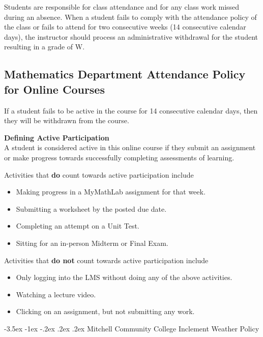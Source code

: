 \documentclass[11pt]{article}
\makeatletter
\renewcommand\section{\@startsection{section}{1}{0pt}%
  {-3.5ex \@plus -1ex \@minus -.2ex}%
  {.2ex \@plus.2ex}%
  {\normalfont\Large\bfseries}} %
\renewenvironment{framed}[1][]{%
  \def\FrameCommand{%
    \hspace{1pt}%
    {\color{mybordercolor}\vrule width 2pt} %
    \hspace{1pt}%
    \fboxsep=\FrameSep%
    \colorbox{mybgcolor}%
  }%
  \MakeFramed {\advance\hsize-\width \FrameRestore}%
}{%
  \endMakeFramed
}
\makeatother
\begin{document}
Students are responsible for class attendance and for any class work missed during an absence. When a student fails to comply with the attendance policy of the class or fails to attend for two consecutive weeks (14 consecutive calendar days), the instructor should process an administrative withdrawal for the student resulting in a grade of W.

\subsection{Mathematics Department Attendance Policy for Online Courses}

If a student fails to be active in the course for 14 consecutive calendar days, then they will be withdrawn from the course.

\begin{framed}
\textbf{Defining Active Participation}\\
A student is considered active in this online course if they submit an assignment or make progress towards successfully completing assessments of learning.

Activities that \textbf{do} count towards active participation include

\begin{itemize}
\item Making progress in a MyMathLab assignment for that week.
\item Submitting a worksheet by the posted due date.
\item Completing an attempt on a Unit Test.
\item Sitting for an in-person Midterm or Final Exam.
\end{itemize}

Activities that \textbf{do not} count towards active participation include

\begin{itemize}
\item Only logging into the LMS without doing any of the above activities.
\item Watching a lecture video.
\item Clicking on an assignment, but not submitting any work.
\end{itemize}
\end{framed}

\section{Mitchell Community College Inclement Weather Policy}
\end{document}
